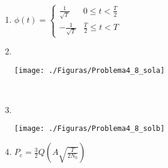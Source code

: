 \documentclass[es,boletin]{uah}
\begin{document}
{

\begin{enumerate}
	\item $\phi(t) = \left \{ \begin{array}{ll} \frac{1}{\sqrt{T}} & 0 \leq t < \frac{T}{2} \\  -\frac{1}{\sqrt{T}} & \frac{T}{2} \leq t < T \end{array} \right.$
	
	\item \ \\
	\begin{figure*}[h!] \centering\texttt{[image: ./Figuras/Problema4\_8\_sola]}	\end{figure*}
	\ \\
	\item \ \\
	\begin{figure*}[h!] 	\centering\texttt{[image: ./Figuras/Problema4\_8\_solb]} 	\end{figure*}
	
	\item $P_e = \frac{3}{2} Q \left ( A \sqrt{\frac{T}{2N_0}} \right ) $
\end{enumerate}

}
\newpage



\newpage
\end{document}

